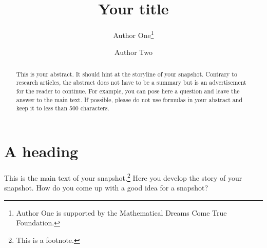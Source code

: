 \documentclass{snapshotmfo}
\author{Author One\thanks{Author One is supported by the Mathematical Dreams Come True Foundation.} \and Author Two}
\title{Your title}
\begin{document}

\begin{abstract}
This is your abstract. It should hint at the storyline of your snapshot. Contrary to research articles, the abstract does not have to be a summary but is an advertisement for the reader to continue. For example, you can pose here a question and leave the answer to the main text. If possible, please do not use formulas in your abstract and keep it to less than 500 characters.
\end{abstract}

\section{A heading}

This is the main text of your snapshot.\footnote{This is a footnote.} Here you develop the story of your snapshot.
How do you come up with a good idea for a snapshot?
\end{document}
